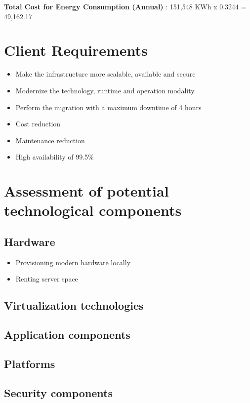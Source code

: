 \documentclass{llncs}
\begin{document}
\textbf{Total Cost for Energy Consumption (Annual)} : 151,548 KWh x 0.3244 \EUR{} = 49,162.17 \EUR{}

\section{Client Requirements}

\begin{itemize}
  \item Make the infrastructure more scalable, available and secure
  \item Modernize the technology, runtime and operation modality
  \item Perform the migration with a maximum downtime of 4 hours
  \item Cost reduction
  \item Maintenance reduction
  \item High availability of 99.5\%
\end{itemize}

\section{Assessment of potential technological components}

\subsection{Hardware}

\begin{itemize}
  \item Provisioning modern hardware locally
  \item Renting server space
\end{itemize}

\subsection{Virtualization technologies}


\subsection{Application components}

\subsection{Platforms}

\subsection{Security components}
\end{document}
